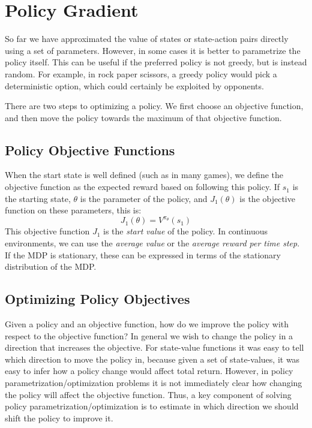 \documentclass{article}
\newcommand{\ita}{\textit}
\begin{document}
\section{Policy Gradient}

So far we have approximated the value of states or state-action pairs directly using a set of parameters. However, in some cases it is better to parametrize the policy itself. This can be useful if the preferred policy is not greedy, but is instead random. For example, in rock paper scissors, a greedy policy would pick a deterministic option, which could certainly be exploited by opponents.

There are two steps to optimizing a policy. We first choose an objective function, and then move the policy towards the maximum of that objective function.

\subsection{Policy Objective Functions}

When the start state is well defined (such as in many games), we define the objective function as the expected reward based on following this policy. If $s_1$ is the starting state, $\theta$ is the parameter of the policy, and $J_1(\theta)$ is the objective function on these parameters, this is:
\begin{equation}\label{eq:policy_objective_function}
J_1(\theta) = V^{\pi_\theta}(s_1)
\end{equation}
This objective function $J_1$ is the \ita{start value} of the policy. In continuous environments, we can use the \ita{average value} or the \ita{average reward per time step}. If the MDP is stationary, these can be expressed in terms of the stationary distribution of the MDP.

\subsection{Optimizing Policy Objectives}

Given a policy and an objective function, how do we improve the policy with respect to the objective function? In general we wish to change the policy in a direction that increases the objective. For state-value functions it was easy to tell which direction to move the policy in, because given a set of state-values, it was easy to infer how a policy change would affect total return. However, in policy parametrization/optimization problems it is not immediately clear how changing the policy will affect the objective function. Thus, a key component of solving policy parametrization/optimization is to estimate in which direction we should shift the policy to improve it.
\end{document}
